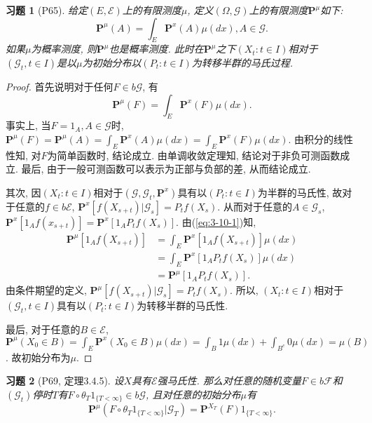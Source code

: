 \documentclass[UTF8,ondside]{ctexart}
\newtheorem{exercise}{习题}[section]
\newcommand{\h}{\mathscr}
\newcommand{\mbf}{\mathbf}
\numberwithin{equation}{section}
\begin{document}
	\begin{exercise}[P65]
		给定$(E,\h E)$上的有限测度$\mu$, 定义$(\Omega,\h G)$上的有限测度$\mbf P^\mu$如下:
		\[
			\mbf P^\mu(A)=\int_E \mbf P^x(A)\mu(dx),A\in\h G.
		\]
		如果$\mu$为概率测度, 则$\mbf P^\mu$也是概率测度. 此时在$\mbf P^\mu$之下$(X_t:t\in I)$相对于$(\h G_t,t\in I)$是以$\mu$为初始分布以$(P_t:t\in I)$为转移半群的马氏过程.
	\end{exercise}
	\begin{proof}
		首先说明对于任何$F\in b\h G$, 有
		\begin{equation}\label{eq:3-10-1}
			\mbf P^\mu(F)=\int_E \mbf P^x(F)\mu(dx).
		\end{equation}
		事实上, 当$F=1_A,A\in\h G$时,
		$
			\mbf P^\mu(F)=\mbf P^\mu(A)=\int_E \mbf P^x(A)\mu(dx)=\int_E \mbf P^x(F)\mu(dx).
		$
		由积分的线性性知, 对$F$为简单函数时, 结论成立. 由单调收敛定理知, 结论对于非负可测函数成立. 最后, 由于一般可测函数可以表示为正部与负部的差, 从而结论成立.

		其次, 因$(X_t:t\in I)$相对于$(\h G,\h G_t,\mbf P^x)$具有以$(P_t:t\in I)$为半群的马氏性, 故对于任意的$f\in b\h E$, $\mbf P^x[f(X_{s+t})|\h G_s]=P_t f(X_s)$. 从而对于任意的$A\in\h G_s$, $\mbf P^x[1_A f(x_{s+t})]=\mbf P^x[1_A P_tf(X_s)]$. 由(\ref{eq:3-10-1})知, 
		\[
			\begin{aligned}
				\mbf P^\mu[1_A f(X_{s+t})]&=\int_E \mbf P^x[1_A f(X_{s+t})]\mu(dx)\\
				&=\int_E \mbf P^x[1_A P_t f(X_s)]\mu(dx)\\
				&=\mbf P^\mu[1_A P_t f(X_s)].
			\end{aligned}
		\]
		由条件期望的定义, $\mbf P^\mu[f(X_{s+t})|\h G_s]=P_t f(X_s)$. 所以, $(X_t:t\in I)$相对于$(\h G_t,t\in I)$具有以$(P_t:t\in I)$为转移半群的马氏性. 

		最后, 对于任意的$B\in\h E$, $\mbf P^\mu(X_0\in B)=\int_E \mbf P^x(X_0\in B)\mu (dx)=\int_B 1 \mu(dx)+\int_{B^c} 0 \mu(dx)=\mu(B)$. 故初始分布为$\mu$. 
	\end{proof}
	\begin{exercise}[P69, 定理3.4.5]
		设$X$具有$\h E$强马氏性. 那么对任意的随机变量$F\in b\h F$和$(\h G_t)$停时$T$有$F\circ\theta_T 1_{\{T<\infty\}}\in b\h G$, 且对任意的初始分布$\mu$有
		\begin{equation}\label{eq:3-11-1}
			\mbf P^\mu(F\circ \theta_T 1_{\{T<\infty\}}|\h G_T)=\mbf P^{X_T}(F)1_{\{T<\infty\}}.
		\end{equation}
	\end{exercise}
\end{document}

